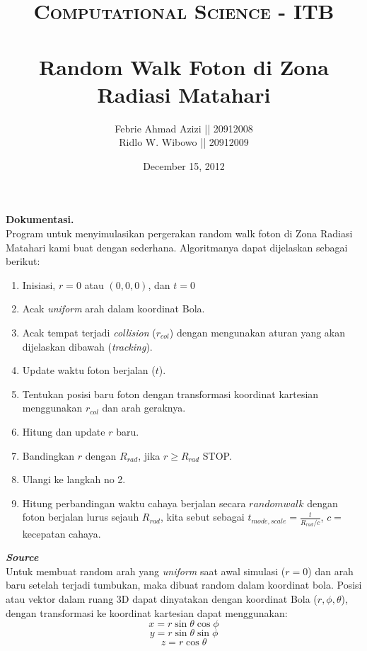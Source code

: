 \documentclass[paper=a4, fontsize=11pt]{scrartcl}
\title{	
\normalfont \normalsize 
\textsc{Computational Science - ITB} \\ [25pt] %
\horrule{0.5pt} \\[0.4cm] %
Random Walk Foton di Zona Radiasi Matahari\\ %
}
\author{\small{Febrie Ahmad Azizi || 20912008} \\ \small{Ridlo W. Wibowo || 20912009}} %
\date{\normalsize December 15, 2012} %
\numberwithin{equation}{section} %
\numberwithin{figure}{section} %
\numberwithin{table}{section} %
\begin{document}
\maketitle %

\large \textbf{Dokumentasi.}\\
Program untuk menyimulasikan pergerakan random walk foton di Zona Radiasi Matahari kami buat dengan sederhana. Algoritmanya dapat dijelaskan sebagai berikut:
\begin{enumerate}
\item Inisiasi, $r = 0$ atau $(0,0,0)$, dan $t = 0$ 
\item Acak \textit{uniform} arah dalam koordinat Bola.
\item Acak tempat terjadi \textit{collision} ($r_{col}$) dengan mengunakan aturan yang akan dijelaskan dibawah (\textit{tracking}).
\item Update waktu foton berjalan ($t$).
\item Tentukan posisi baru foton dengan transformasi koordinat kartesian menggunakan $r_{col}$ dan arah geraknya.
\item Hitung dan update $r$ baru.
\item Bandingkan $r$ dengan $R_{rad}$, jika $r \geq R_{rad}$ STOP.
\item Ulangi ke langkah no 2. 
\item Hitung perbandingan waktu cahaya berjalan secara $randomwalk$ dengan foton berjalan lurus sejauh $R_{rad}$, kita sebut sebagai $t_{mode,scale} = \frac{t}{R_{rad}/c}$, $ c = $ kecepatan cahaya.
\end{enumerate}

\newpage
\textbf{	\textit{Source}}\\
Untuk membuat random arah yang \textit{uniform} saat awal simulasi ($r = 0$) dan arah baru setelah terjadi tumbukan, maka dibuat random dalam koordinat bola. Posisi atau vektor dalam ruang 3D dapat dinyatakan dengan koordinat Bola ($r, \phi, \theta$), dengan transformasi ke koordinat kartesian dapat menggunakan:
\begin{equation*}
x = r \sin\theta \cos\phi
\end{equation*}
\begin{equation*}
y = r \sin\theta \sin\phi
\end{equation*}
\begin{equation*}
z = r \cos\theta
\end{equation*}
\end{document}
